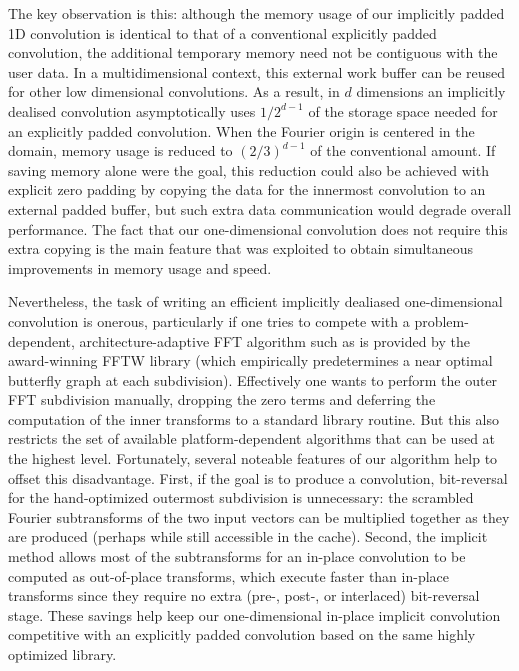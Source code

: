 \documentclass[final]{siamltex}
\begin{document}
The key observation is this: although the memory usage of our implicitly
padded 1D convolution is identical to that of a conventional explicitly
padded convolution, the additional temporary memory need not be contiguous
with the user data.  In a multidimensional context, this external work
buffer can be reused for other low dimensional convolutions.
As a result, in $d$ dimensions an implicitly dealised convolution
asymptotically uses $1/2^{d-1}$ of the
storage space needed for an explicitly padded convolution. When the Fourier origin is
centered in the domain, memory usage is reduced to $(2/3)^{d-1}$ of the
conventional amount.
If saving memory alone were the goal, this reduction could
also be achieved with explicit zero padding by copying the data for the
innermost convolution to an external padded buffer, but such extra data
communication would degrade overall performance. The fact that our
one-dimensional convolution does not require this extra copying is the
main feature that was exploited to obtain simultaneous improvements in
memory usage and speed.

Nevertheless, the task of writing an efficient implicitly dealiased
one-dimensional convolution is onerous, particularly if one tries to
compete with a problem-dependent, architecture-adaptive
FFT algorithm such as is provided by the award-winning FFTW \cite{Frigo05}
library (which empirically predetermines a near optimal butterfly graph
at each subdivision). Effectively one wants to perform
the outer FFT subdivision manually, dropping the zero terms and
deferring the computation of the inner transforms to a standard library
routine. But this also restricts the set of available platform-dependent
algorithms that can be used at the highest level. Fortunately, several 
noteable features of our algorithm help to offset this disadvantage. First, if
the goal is to  produce a convolution, bit-reversal for the hand-optimized
outermost subdivision is unnecessary: the scrambled Fourier subtransforms of the
two input vectors can be multiplied together as they are produced
(perhaps while still accessible in the cache). Second, the implicit
method allows most of the subtransforms for an in-place convolution to
be computed as out-of-place transforms, which execute faster than
in-place transforms since they require no extra (pre-, post-, or
interlaced) bit-reversal stage.  These savings help keep our
one-dimensional in-place implicit convolution competitive with an
explicitly padded convolution based on the same highly optimized
library.
\end{document}
